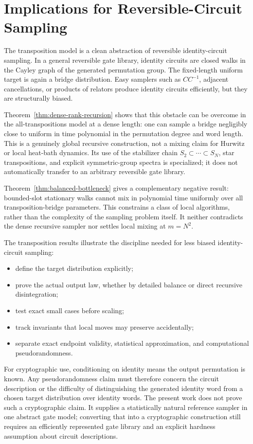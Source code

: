 \section{Implications for Reversible-Circuit Sampling}

The transposition model is a clean abstraction of reversible identity-circuit
sampling.  In a general reversible gate library, identity circuits are closed
walks in the Cayley graph of the generated permutation group.  The fixed-length
uniform target is again a bridge distribution.  Easy samplers such as
$CC^{-1}$, adjacent cancellations, or products of relators produce identity
circuits efficiently, but they are structurally biased.

Theorem~\ref{thm:dense-rank-recursion} shows that this obstacle can be overcome
in the all-transpositions model at a dense length: one can sample a bridge
negligibly close to uniform in time polynomial in the permutation degree and
word length.  This is a genuinely global recursive construction, not a mixing
claim for Hurwitz or local heat-bath dynamics.  Its use of the stabilizer chain
$S_2\subset\cdots\subset S_N$, star transpositions, and explicit symmetric-group
spectra is specialized; it does not automatically transfer to an arbitrary
reversible gate library.

Theorem~\ref{thm:balanced-bottleneck} gives a complementary negative result:
bounded-slot stationary walks cannot mix in polynomial time uniformly over
all transposition-bridge parameters.  This constrains a class of local
algorithms, rather than the complexity of the sampling problem itself.
It neither contradicts the dense recursive sampler nor settles local
mixing at $m=N^2$.

The transposition results illustrate the discipline needed for less biased
identity-circuit sampling:
\begin{itemize}
\item define the target distribution explicitly;
\item prove the actual output law, whether by detailed balance or direct
  recursive disintegration;
\item test exact small cases before scaling;
\item track invariants that local moves may preserve accidentally;
\item separate exact endpoint validity, statistical approximation, and
  computational pseudorandomness.
\end{itemize}

For cryptographic use, conditioning on identity means the output permutation is
known.  Any pseudorandomness claim must therefore concern the circuit
description or the difficulty of distinguishing the generated identity word
from a chosen target distribution over identity words.  The present work does
not prove such a cryptographic claim.  It supplies a statistically natural
reference sampler in one abstract gate model; converting that into a
cryptographic construction still requires an efficiently represented gate
library and an explicit hardness assumption about circuit descriptions.
